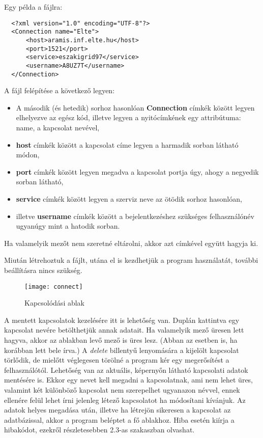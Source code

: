 Egy példa a fájlra:

\begin{lstlisting}
  <?xml version="1.0" encoding="UTF-8"?>
  <Connection name="Elte">
      <host>aramis.inf.elte.hu</host>
      <port>1521</port>
      <service>eszakigrid97</service>
      <username>A8UZ7T</username>
  </Connection>
\end{lstlisting}

A fájl felépítése a következő legyen:
\begin{itemize}
  \item A második (és hetedik) sorhoz hasonlóan \textbf{Connection} címkék között legyen elhelyezve az egész kód, illetve legyen a
  nyitócímkének egy attribútuma: name, a kapcsolat nevével,
  \item \textbf{host} címkék között a kapcsolat címe legyen a harmadik sorban látható módon,
  \item \textbf{port} címkék között legyen megadva a kapcsolat portja úgy, ahogy a negyedik sorban látható,
  \item \textbf{service} címkék között legyen a szerviz neve az ötödik sorhoz hasonlóan,
  \item illetve \textbf{username} címkék között a bejelentkezéshez szükséges felhasználónév ugyanúgy mint a hatodik sorban.
\end{itemize}
Ha valamelyik mezőt nem szeretné eltárolni, akkor azt címkével együtt hagyja ki.

Miután létrehoztuk a fájlt, utána el is kezdhetjük a program használatát, további beállításra nincs szükség.
\begin{figure}[ht]
  \begin{center}
  \texttt{[image: connect]}
  \end{center}
 \caption{Kapcsolódási ablak}
\end{figure}
A mentett kapcsolatok kezelésére itt is lehetőség van.
Duplán kattintva egy kapcsolat nevére betölthetjük annak adatait. Ha valamelyik mező üresen lett hagyva,
akkor az ablakban levő mező is üres lesz. (Abban az esetben is, ha korábban lett bele írva.)
A \textit{delete} billentyű lenyomására a kijelölt kapcsolat törlődik, de
mielőtt véglegesen törölné a program kér egy megerősítést a felhasználótól.
Lehetőség van az aktuális, képernyőn látható kapcsolati adatok mentésére is. Ekkor egy nevet kell megadni a kapcsolatnak, ami nem lehet üres,
valamint két különböző kapcsolat nem szerepelhet ugyanazon névvel, ennek ellenére felül lehet írni jelenleg létező kapcsolatot ha módosítani
kívánjuk.
Az adatok helyes megadása után, illetve ha létrejön sikeresen a kapcsolat az adatbázissal, akkor a program beléptet a fő ablakhoz.
Hiba esetén kiírja a hibakódot, ezekről részletesebben 2.3-as szakaszban olvashat.

